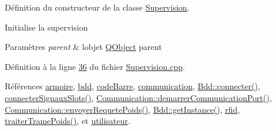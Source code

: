 Définition du constructeur de la classe \hyperlink{class_supervision}{Supervision}. 

Initialise la supervision 
\begin{DoxyParams}{Paramètres}
{\em parent} & l\textquotesingle{}objet \hyperlink{class_q_object}{Q\+Object} parent \\
\hline
\end{DoxyParams}


Définition à la ligne \hyperlink{_supervision_8cpp_source_l00036}{36} du fichier \hyperlink{_supervision_8cpp_source}{Supervision.\+cpp}.



Références \hyperlink{_supervision_8h_source_l00084}{armoire}, \hyperlink{_supervision_8h_source_l00080}{bdd}, \hyperlink{_supervision_8h_source_l00083}{code\+Barre}, \hyperlink{_supervision_8h_source_l00085}{communication}, \hyperlink{_bdd_8cpp_source_l00093}{Bdd\+::connecter()}, \hyperlink{_supervision_8cpp_source_l00273}{connecter\+Signaux\+Slots()}, \hyperlink{_communication_8cpp_source_l00042}{Communication\+::demarrer\+Communication\+Port()}, \hyperlink{_communication_8cpp_source_l00179}{Communication\+::envoyer\+Requete\+Poids()}, \hyperlink{_bdd_8cpp_source_l00053}{Bdd\+::get\+Instance()}, \hyperlink{_supervision_8h_source_l00081}{rfid}, \hyperlink{_supervision_8cpp_source_l00370}{traiter\+Trame\+Poids()}, et \hyperlink{_supervision_8h_source_l00082}{utilisateur}.


